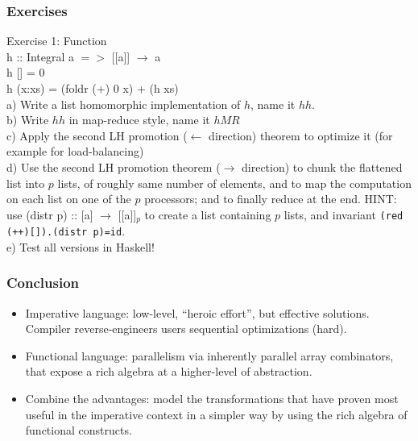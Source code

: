 \documentclass{beamer}
\renewcommand{\emph}[1]{\textcolor{structure}{#1}}
\begin{document}
\begin{frame}[fragile,t]
  \frametitle{Exercises}

\alert{Exercise 1}: Function \\
h :: Integral a $=>$ [[a]] $\rightarrow$ a \\
h []   = 0 \\
h (x:xs) = (foldr (+) 0 x) + (h xs) \\
\smallskip
a) Write a list homomorphic implementation of $h$, name it $hh$. \\ \smallskip
b) Write $hh$ in map-reduce style, name it $hMR$ \\ \smallskip
c) Apply the second LH promotion ($\leftarrow$ direction) theorem to optimize it (for example for load-balancing) \\ \smallskip
d) Use the second LH promotion theorem ($\rightarrow$ direction) to chunk the flattened list into $p$ lists, 
    of roughly same number of elements, and to map the computation on each list on one of the $p$ processors; 
    and to finally reduce at the end.  \emph{HINT:} use (distr p) :: [a] $\rightarrow$ [[a]]$_p$ to create a list containing $p$ lists, and invariant {\tt(red (++)[]).(distr p)=id}.  \\ \smallskip
e) Test all versions in Haskell! 




\end{frame}


\begin{frame}[fragile,t]
  \frametitle{Conclusion}

\begin{itemize}
    \item Imperative language: low-level, ``heroic effort'', but effective solutions.
            Compiler reverse-engineers users sequential optimizations (hard).\bigskip
    \item Functional language: parallelism via inherently parallel array combinators, 
            that expose a rich algebra at a higher-level of abstraction.\bigskip
    \item Combine the advantages: model the transformations that have proven most useful
            in the imperative context in a simpler way by using the rich algebra of functional constructs.
\end{itemize}

\end{frame}
\end{document}
